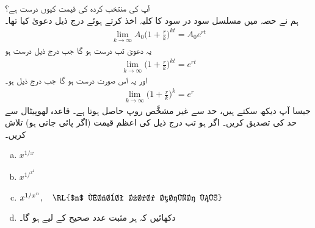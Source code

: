 آپ کی منتخب کردہ  کی قیمت کیوں درست ہے؟
\\
ہم نے حصہ  میں مسلسل سود در سود کا کلیہ  اخذ کرتے ہوئے  درج ذیل دعویٰ کیا تھا۔ 
\begin{align*}
\lim_{k\to \infty}A_0\big(1+\frac{r}{k}\big)^{kt}=A_0e^{rt}
\end{align*}
یہ دعویٰ تب درست ہو گا جب درج ذیل درست ہو
\begin{align*}
\lim_{k\to \infty}\big(1+\frac{r}{k}\big)^{kt}=e^{rt}
\end{align*}
اور یہ اس صورت درست ہو گا جب درج ذیل ہو۔
\begin{align*}
\lim_{k\to \infty}\big(1+\frac{r}{k}\big)^k=e^r
\end{align*}
جیسا آپ دیکھ سکتے ہیں، حد سے غیر مشخَّص روپ  حاصل ہوتا ہے۔ قاعدہ لھوپیٹال سے حد کی تصدیق کریں۔
اگر  ہو تب درج ذیل کی اعظم قیمت  (اگر پائی جاتی ہو) تلاش کریں۔
\begin{enumerate}[a.]
\item
$x^{1/x}$
\item
$x^{1/^{x^2}}$
\item
$x^{1/{x^n}},\quad \text{\RL{$n$ مثبت عدد صحیح ہے}}$
\item
دکھائیں کہ ہر مثبت عدد صحیح  کے لیے  ہو گا۔
\end{enumerate}


